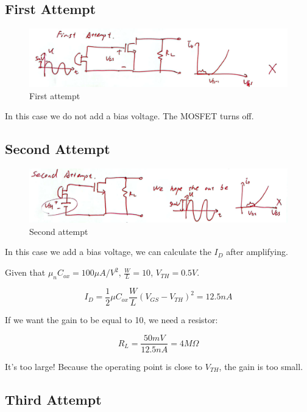 \documentclass[fontset=windows]{article}
\begin{document}
\subsection*{First Attempt}

\begin{figure}[htbp]
    \centering
    \includegraphics[scale=0.6]{4.jpg}
    \captionsetup{labelformat=empty}
    \caption{First attempt}
    \label{4}
\end{figure}

In this case we do not add a bias voltage. The MOSFET turns off. 

\subsection*{Second Attempt}

\begin{figure}[htbp]
    \centering
    \includegraphics[scale=0.6]{5.jpg}
    \captionsetup{labelformat=empty}
    \caption{Second attempt}
    \label{5}
\end{figure}

In this case we add a bias voltage, we can calculate the $I_D$ after amplifying. 

Given that $\mu_nC_{ox}=100\mu A/V^2$, $\frac{W}{L}=10$, $V_{TH}=0.5V$. 

$$I_D=\frac{1}{2} \mu C_{ox}\frac{W}{L}(V_{GS}-V_{TH})^2=12.5nA$$

If we want the gain to be equal to 10, we need a resistor: 

$$R_L=\frac{50mV}{12.5nA}=4M\Omega$$

It's too large! Because the operating point is close to $V_{TH}$, the gain is too small. 

\subsection*{Third Attempt}
\end{document}
